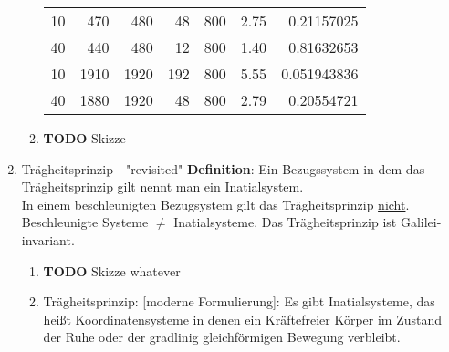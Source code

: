 \documentclass[11pt]{article}
\begin{document}
\begin{enumerate}
\begin{enumerate}
\begin{center}
\begin{tabular}{rrrrrrr}
\hline
10 & 470 & 480 & 48 & 800 & 2.75 & 0.21157025\\
40 & 440 & 480 & 12 & 800 & 1.40 & 0.81632653\\
10 & 1910 & 1920 & 192 & 800 & 5.55 & 0.051943836\\
40 & 1880 & 1920 & 48 & 800 & 2.79 & 0.20554721\\
\end{tabular}
\end{center}
\item {\bfseries\sffamily TODO} Skizze
\label{sec-7-2-1-4-3}
\end{enumerate}
\item Trägheitsprinzip - "revisited"
\label{sec-7-2-1-5}
\textbf{Definition}: Ein Bezugssystem in dem das Trägheitsprinzip gilt nennt man ein Inatialsystem. \\

In einem beschleunigten Bezugsystem gilt das Trägheitsprinzip \uline{nicht}. Beschleunigte Systeme $\neq$ Inatialsysteme.
Das Trägheitsprinzip ist Galilei-invariant.

\begin{enumerate}
\item {\bfseries\sffamily TODO} Skizze whatever
\label{sec-7-2-1-5-1}
\item Trägheitsprinzip: [moderne Formulierung]:
\label{sec-7-2-1-5-2}
Es gibt Inatialsysteme, das heißt Koordinatensysteme  in denen ein Kräftefreier Körper im Zustand der Ruhe oder der gradlinig gleichförmigen Bewegung verbleibt.
\end{enumerate}


\end{enumerate}
\end{document}

